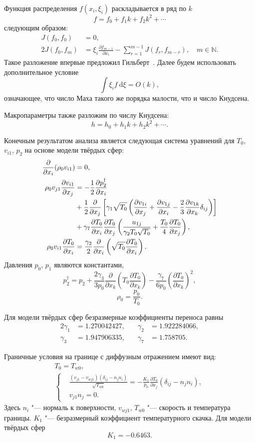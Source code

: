 \documentclass[english,russian,a4paper,12pt]{article}
\newcommand{\dd}{\:\mathrm{d}}
\newcommand{\pder}[2][]{\frac{\partial#1}{\partial#2}}
\begin{document}
Функция распределения \(f(x_i,\xi_i)\) раскладывается в ряд по \(k\)
\[ f = f_0 + f_1k + f_2k^2 + \cdots \]
следующим образом:
\begin{align*}
	J(f_0,f_0) &= 0, \\
	2J(f_0,f_m) &= \xi_i\pder[f_{m-1}]{x_i} - \sum\limits_{r=1}^{m-1}J(f_r,f_{m-r}), \quad m \in \mathbb{N}.
\end{align*}
Такое разложение впервые предложил Гильберт~\cite{Hilbert1912}. Далее будем использовать дополнительное условие
\[ \int\xi_if\dd\xi = O(k), \]
означающее, что число Маха такого же порядка малости, что и число Кнудсена.

Макропараметры также разложим по числу Кнудсена:
\[ h = h_0 + h_1k + h_2k^2 + \cdots. \]

Конечным результатом анализа является следующая система уравнений для \(T_0\), \(v_{i1}\), \(p_2\)
на основе модели твёрдых сфер:
\begin{align}
	\pder{x_i}(\rho_0v_{i1}) &= 0, \label{eq:asymptotic1} \\
	\rho_0v_{j1}\pder[v_{i1}]{x_j} &= -\frac12\pder[p_2^\dag]{x_i} \notag\\
		&+ \frac12\pder{x_j}\left[\gamma_1\sqrt{T_0}\left(
			\pder[v_{1i}]{x_j}+\pder[v_{1j}]{x_i}-\frac23\pder[v_{1k}]{x_k}\delta_{ij}\right
		)\right] \notag\\
		&+ \gamma_7\pder[T_0]{x_i}\pder[T_0]{x_j}\left(
			\frac{u_{1j}}{\gamma_2T_0\sqrt{T_0}} + \frac{T_0}4\pder[T_0]{x_j}
		\right), \label{eq:asymptotic2} \\
	\rho_0v_{i1}\pder[T_0]{x_i} &= \frac{\gamma_2}2\pder{x_i}\left(
		\sqrt{T_0}\pder[T_0]{x_i}
	\right). \label{eq:asymptotic3}
\end{align}
Давления \(p_0\), \(p_1\) являются константами,
\[ 
	p_2^\dag = p_2 + 
		\frac{2\gamma_3}{3p_0}\pder{x_k}\left(T_0\pder[T_0]{x_k}\right) -
		\frac{\gamma_7}{6p_0}\left(\pder[T_0]{x_k}\right)^2,
\]
\[ \rho_0 = \frac{p_0}{T_0}. \]

Для модели твёрдых сфер безразмерные коэффициенты переноса равны
\begin{alignat*}{2}
	\gamma_1 &= 1.270042427, &\quad \gamma_2 &= 1.922284066, \\
	\gamma_3 &= 1.947906335, &\quad \gamma_7 &= 1.758705.
\end{alignat*}

Граничные условия на границе с диффузным отражением имеют вид:
\begin{gather}
	T_0 = T_{w0}, \\
	\left\{
	\begin{aligned}
		& \frac{(v_{j1}-v_{wj1})(\delta_{ij}-n_jn_i)}{\sqrt{T_{w0}}} = 
			-\frac{K_1}{p_0}\pder[T_0]{x_j}(\delta_{ij}-n_jn_i), \\
		& v_{j1}n_j = 0.
	\end{aligned}
	\right.
\end{gather}
Здесь \(n_i\) "--- нормаль к поверхности, \(v_{wj1}\), \(T_{w0}\) "--- скорость и температура границы.
\(K_1\) "--- безразмерный коэффициент температурного скачка. Для модели твёрдых сфер 
\[ K_1 = -0.6463. \]
\end{document}
